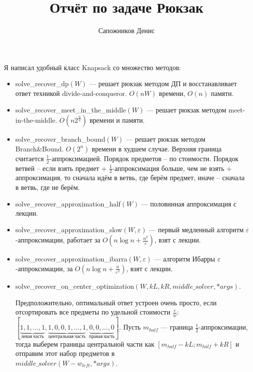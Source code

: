 

\newcommand{\ma}{\displaystyle}


	\title{Отчёт по задаче Рюкзак}
	\author{Сапожников Денис}
	\date{}
	\maketitle
	Я написал удобный класс Knapsack со множество методов:
	\begin{itemize}
		\item solve\_recover\_dp$(W)$ --- решает рюкзак методом ДП и восстанавливает ответ техникой divide-and-conqueror. $O(nW)$ времени, $O(n)$ памяти.
		\item solve\_recover\_meet\_in\_the\_middle$(W)$ --- решает рюкзак методом meet-in-the-middle. $O(n2^{\frac{n}{2}})$ времени и памяти.
		\item solve\_recover\_branch\_bound$(W)$ --- решает рюкзак методом Branch\&Bound. $O(2^n)$ времени в худшем случае. Верхняя граница считается $\frac{1}{2}$-аппроксимацией. Порядок предметов -- по стоимости. Порядок ветвей -- если взять предмет + $\frac{1}{2}$-аппроксимация больше, чем не взять + аппроксимация, то сначала идём в ветвь, где берём предмет, иначе -- сначала в ветвь, где не берём.
		\item solve\_recover\_approximation\_half$(W)$ --- половинная аппроксимация с лекции.
		\item solve\_recover\_approximation\_slow$(W, \varepsilon)$ --- первый медленный алгоритм $\varepsilon$-аппроксимации, работает за $O(n \log n + \frac{n^2}{\varepsilon})$, взят с лекции.
		\item solve\_recover\_approximation\_ibarra$(W, \varepsilon)$ --- алгоритм Ибарры $\varepsilon$-аппроксимации, за $O(n \log n + \frac{n}{\varepsilon^2})$, взят с лекции.
		\item solve\_recover\_on\_center\_optimization$(W, kL, kR, middle\_solver, *args)$. 
		
		Предположительно, оптимальный ответ устроен очень просто, если отсортировать все предметы по удельной стоимости $\frac{c}{w}$: $[\underbrace{1, 1, \ldots, 1}_{левая\ часть}, \underbrace{1, 0, 0, 1, \ldots, 1}_{центральная\ часть}, \underbrace{0, 0, \ldots, 0}_{правая\ часть}]$. Пусть $m_{half}$ --- граница $\frac{1}{2}$-аппроксимации, тогда выберем границы центральной части как $[m_{half} - kL; m_{half} + kR]$ и отправим этот набор предметов в \\
		$middle\_solver(W - w_{left}, *args)$. 
	\end{itemize}
	
